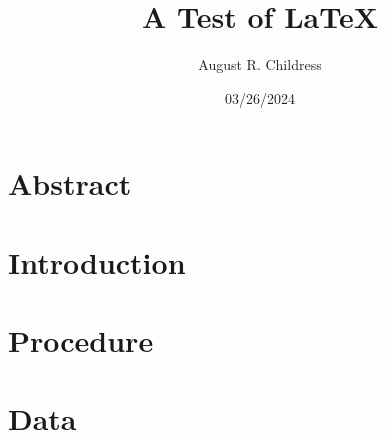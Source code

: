 \documentclass{article}
\author{August R. Childress}
\title{A Test of LaTeX}
\date{03/26/2024}
\begin{document}
\maketitle

\section{Abstract}


\section{Introduction}


\section{Procedure}


\section{Data}







\end{document}
